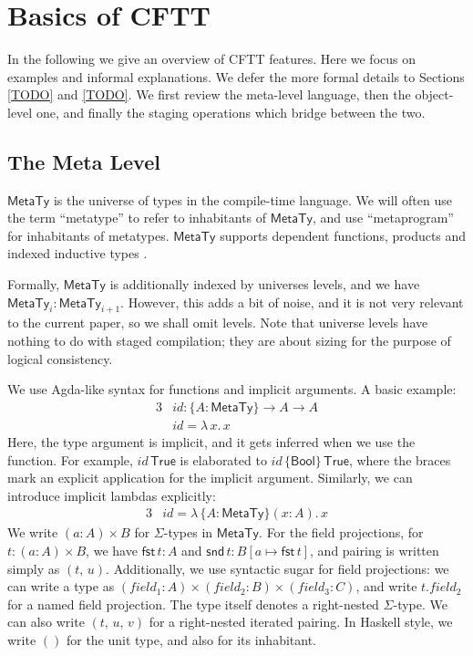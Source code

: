 \documentclass[acmsmall,screen,review,anonymous]{acmart}
\newcommand{\mit}[1]{\mathit{#1}}
\newcommand{\msf}[1]{\mathsf{#1}}
\newcommand{\bs}[1]{\boldsymbol{#1}}
\newcommand{\lam}{\lambda\,}
\newcommand{\Bool}{\msf{Bool}}
\newcommand{\MTy}{\msf{MetaTy}}
\newcommand{\True}{\msf{True}}
\newcommand{\fst}{\msf{fst}}
\newcommand{\snd}{\msf{snd}}
\theoremstyle{remark}
\newcommand{\id}{\mit{id}}
\begin{document}


\section{Basics of CFTT}\label{sec:basics-of-cftt}

In the following we give an overview of CFTT features. Here we focus on examples
and informal explanations. We defer the more formal details to Sections
\ref{TODO} and \ref{TODO}. We first review the meta-level language, then the
object-level one, and finally the staging operations which bridge between the
two.

\subsection{The Meta Level}\label{sec:the-meta-level}

$\bs{\MTy}$ is the universe of types in the compile-time language. We will often
use the term ``metatype'' to refer to inhabitants of $\MTy$, and use
``metaprogram'' for inhabitants of metatypes. $\MTy$ supports dependent
functions, products and indexed inductive types \cite{TODO}.

Formally, $\MTy$ is additionally indexed by universes levels, and we have
$\MTy_i : \MTy_{i+1}$. However, this adds a bit of noise, and it is not very
relevant to the current paper, so we shall omit levels. Note that universe
levels have nothing to do with staged compilation; they are about sizing for the
purpose of logical consistency.

We use Agda-like syntax for functions and implicit arguments. A basic example:
\begin{alignat*}{3}
  &\id : \{A : \MTy\} \to A \to A\\
  &\id = \lam x.\, x
\end{alignat*}
Here, the type argument is implicit, and it gets inferred when we use the
function. For example, $id\,\True$ is elaborated to $id\,\{\Bool\}\,\True$,
where the braces mark an explicit application for the implicit argument.
Similarly, we can introduce implicit lambdas explicitly:
\begin{alignat*}{3}
  &id = \lam \{A : \MTy\}(x : A).\,x
\end{alignat*}
We write $(a : A) \times B$ for $\Sigma$-types in $\MTy$. For the field
projections, for $t : (a : A) \times B$, we have $\fst\,t : A$ and $\snd\,t :
B[a \mapsto \fst\,t]$, and pairing is written simply as $(t,\,u)$. Additionally,
we use syntactic sugar for field projections: we can write a type as $(field_1 :
A) \times (field_2 : B) \times (field_3 : C)$, and write $t.field_2$ for a named
field projection. The type itself denotes a right-nested $\Sigma$-type. We can
also write $(t,\,u,\,v)$ for a right-nested iterated pairing. In Haskell style,
we write $()$ for the unit type, and also for its inhabitant.
\end{document}
